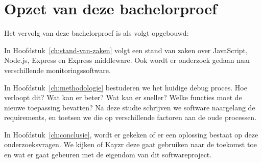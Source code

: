 \section{Opzet van deze bachelorproef}
\label{sec:opzet-bachelorproef}


Het vervolg van deze bachelorproef is als volgt opgebouwd:

In Hoofdstuk~\ref{ch:stand-van-zaken} volgt een stand van zaken over JavaScript, Node.js, Express en Express middleware. Ook wordt er onderzoek gedaan naar verschillende monitoringssoftware.

In Hoofdstuk~\ref{ch:methodologie} bestuderen we het huidige debug proces. Hoe verloopt dit? Wat kan er beter? Wat kan er sneller? Welke functies moet de nieuwe toepassing bevatten? Na deze studie schrijven we software naargelang de requirements, en toetsen we die op verschillende factoren aan de oude processen.


In Hoofdstuk~\ref{ch:conclusie}, wordt er gekeken of er een oplossing bestaat op deze onderzoeksvragen. We kijken of Kayzr deze gaat gebruiken naar de toekomst toe en wat er gaat gebeuren met de eigendom van dit softwareproject.

